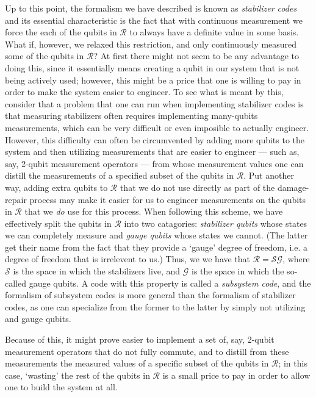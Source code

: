 \documentclass[twocolumn,showpacs,preprintnumbers,amsmath,amssymb,nofootinbib,pra,floatfix]{revtex4}
\begin{document}
Up to this point, the formalism we have described is known as \emph{stabilizer codes} and its essential characteristic is the fact that with continuous measurement we force the each of the qubits in $\mathscr{R}$ to always have a definite value in some basis.  What if, however, we relaxed this restriction, and only continuously measured some of the qubits in $\mathscr{R}$?  At first there might not seem to be any advantage to doing this, since it essentially means creating a qubit in our system that is not being actively used;  however, this might be a price that one is willing to pay in order to make the system easier to engineer.  To see what is meant by this, consider that a problem that one can run when implementing stabilizer codes is that measuring stabilizers often requires implementing many-qubits measurements, which can be very difficult or even imposible to actually engineer.  However, this difficulty can often be circumvented by adding more qubits to the system and then utilizing measurements that are easier to engineer --- such as, say, 2-qubit measurement operators --- from whose measurement values one can distill the measurements of a specified subset of the qubits in $\mathscr{R}$.  Put another way, adding extra qubits to $\mathscr{R}$ that we do not use directly as part of the damage-repair process may make it easier for us to engineer measurements on the qubits in $\mathscr{R}$ that we \emph{do} use for this process.  When following this scheme, we have effectively split the qubits in $\mathscr{R}$ into two catagories:  \emph{stabilizer qubits} whose states we can completely measure and \emph{gauge qubits} whose states we cannot.  (The latter get their name from the fact that they provide a `gauge' degree of freedom, i.e. a degree of freedom that is irrelevent to us.)  Thus, we we have that $\mathscr{R}=\mathscr{S}\mathscr{G}$, where $\mathscr{S}$ is the space in which the stabilizers live, and $\mathscr{G}$ is the space in which the so-called gauge qubits.  A code with this property is called a \emph{subsystem code}, and the formalism of subsystem codes is more general than the formalism of stabilizer codes, as one can specialize from the former to the latter by simply not utilizing and gauge qubits.



Because of this, it might prove easier to implement a set of, say, 2-qubit measurement operators that do not fully commute, and to distill from these measurements the measured values of a specific subset of the qubits in $\mathscr{R}$;  in this case, `wasting' the rest of the qubits in $\mathscr{R}$ is a small price to pay in order to allow one to build the system at all.
\end{document}
